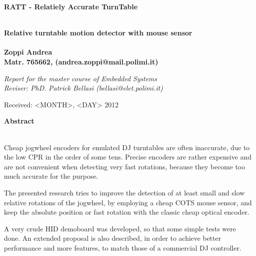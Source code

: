 \documentclass[a4paper,10pt]{article}
\newenvironment*{mytitle}{\begin{LARGE}\bf}{\end{LARGE}\\}%
\newenvironment*{mysubtitle}{\bf}{\\[1.5ex]}%
\newenvironment*{myabstract}{\begin{Large}\bf}{\end{Large}\\[2.5ex]}%
\begin{document}
\newcommand{\TODO}{\textbf{TODO\dots\ }}
\newcommand{\CITEME}{\textbf{[CITEME]}}
\newcommand{\INSFIG}{\textbf{Figure PLACEHOLDER}}


\begin{mytitle}RATT	- Relatiely Accurate TurnTable\end{mytitle}
\begin{mysubtitle}Relative turntable motion detector with mouse sensor\end{mysubtitle}
\\
Zoppi Andrea\\
Matr. 765662, (andrea.zoppi@mail.polimi.it)\\
\begin{flushright}
\emph{Report for the master course of Embedded Systems}\\
\emph{Reviser: PhD. Patrick Bellasi (bellasi@elet.polimi.it)}
\end{flushright}

Received: <MONTH>, <DAY> 2012\\
\hspace{10ex}

\begin{myabstract} Abstract \end{myabstract}
Cheap jogwheel encoders for emulated DJ turntables are often inaccurate, due to
the low CPR in the order of some tens. Precise encoders are rather expensive and
are not convenient when detecting very fast rotations, because they become too
much accurate for the purpose.

The presented research tries to improve the detection of at least small and slow
relative rotations of the jogwheel, by employing a cheap COTS mouse sensor, and
keep the absolute position or fast rotation with the classic cheap optical encoder.

A very crude HID demoboard was developed, so that some simple tests were done.
An extended proposal is also described, in order to achieve better performance
and more features, to match those of a commercial DJ controller.
\end{document}
